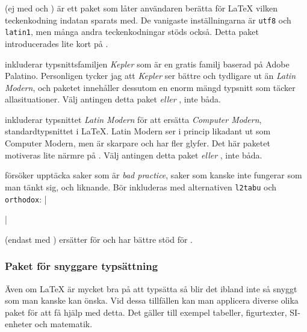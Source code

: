 \documentclass[lang=sv,ptsize=10pt,font=none,nomath,titles=bf,../../a4.tex]{subfiles}
\begin{document}
\begin{description}
	\item[\pack{inputenx}] (ej med \XeTeX och )
	är ett paket som låter användaren berätta för \LaTeX{} vilken
	teckenkodning indatan sparats med. De vanigaste inställningarna är
	\texttt{utf8} och \texttt{latin1}, men många andra teckenkodningar
	stöds också.
	Detta paket introducerades lite kort på .

	\item[\pack{kpfonts}]
	inkluderar typsnittsfamiljen \emph{Kepler} som är en gratis familj
	baserad på Adobe Palatino. Personligen tycker jag att \emph{Kepler}
	ser bättre och tydligare ut än \emph{Latin Modern}, och paketet
	innehåller dessutom en enorm mängd typsnitt som täcker allasituationer.
	Välj antingen detta paket \emph{eller} , inte båda.
	
	\item[\pack{lmodern}]
	inkluderar typsnittet \emph{Latin Modern} för att ersätta
	\emph{Computer Modern}, standardtypsnittet i \LaTeX. Latin Modern ser
	i princip likadant ut som Computer Modern, men är skarpare och har
	fler glyfer. Det här paketet motiveras lite närmre på 
	. Välj antingen detta paket \emph{eller}
	, inte båda.
	
	\item[{\pack{nag}}]
	försöker upptäcka saker som är \emph{bad practice}, saker som kanske
	inte fungerar som man tänkt sig, och liknande. Bör inkluderas med
	alternativen \texttt{l2tabu} och \texttt{orthodox}:
	\latex|\usepackage[l2tabu,orthodox]{nag}|

	\item[{\pack{polyglossia}}] (endast med \XeTeX)
	ersätter  för \XeTeX och har bättre stöd för \UTF.
\end{description}

\subsubsection{Paket för snyggare typsättning}
Även om \LaTeX{} är mycket bra på att typsätta så blir det ibland inte
så snyggt som man kanske kan önska. Vid dessa tillfällen kan man
applicera diverse olika paket för att få hjälp med detta. Det gäller
till exempel tabeller, figurtexter, SI-enheter och matematik.
\end{document}
